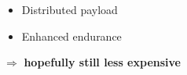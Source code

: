 \documentclass[12pt,svgnames,table,draft=false]{beamer}
\begin{document}

\usebackgroundtemplate{
}

\begin{frame}{}

\vspace{-8em}
\centering
\begin{tcolorbox}[width=.8\textwidth,colback={gray!10!}]  
\centering
\begin{itemize}
\item Distributed payload
\item Enhanced endurance
\end{itemize}
\centering
$\Rightarrow$ \textbf{hopefully still less expensive}
\end{tcolorbox}  

\end{frame}
\end{document}
